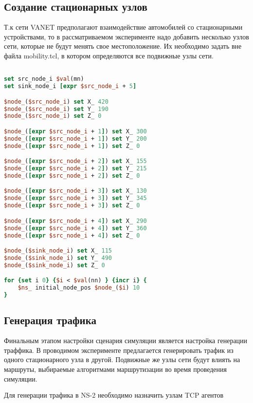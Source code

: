 \subsection*{Создание стационарных узлов}

Т.к сети VANET предполагают взаимодействие автомобилей со стационарными устройствами, то в рассматриваемом эксперименте надо добавить несколько узлов сети, которые не будут менять свое местоположение. Их необходимо задать вне файла mobility.tcl, в котором определяются все подвижные узлы сети.

\begin{lstlisting}[language=tcl, style=mystyle, caption=Настройка узлов сети]

set src_node_i $val(mn)
set sink_node_i [expr $src_node_i + 5]

$node_($src_node_i) set X_ 420
$node_($src_node_i) set Y_ 190
$node_($src_node_i) set Z_ 0

$node_([expr $src_node_i + 1]) set X_ 300
$node_([expr $src_node_i + 1]) set Y_ 200
$node_([expr $src_node_i + 1]) set Z_ 0

$node_([expr $src_node_i + 2]) set X_ 155
$node_([expr $src_node_i + 2]) set Y_ 215
$node_([expr $src_node_i + 2]) set Z_ 0

$node_([expr $src_node_i + 3]) set X_ 130
$node_([expr $src_node_i + 3]) set Y_ 345
$node_([expr $src_node_i + 3]) set Z_ 0

$node_([expr $src_node_i + 4]) set X_ 290
$node_([expr $src_node_i + 4]) set Y_ 360
$node_([expr $src_node_i + 4]) set Z_ 0

$node_($sink_node_i) set X_ 115
$node_($sink_node_i) set Y_ 490
$node_($sink_node_i) set Z_ 0

for {set i 0} {$i < $val(nn) } {incr i} {
    $ns_ initial_node_pos $node_($i) 10
}
\end{lstlisting}


\subsection*{Генерация трафика}

Финальным этапом настройки сценария симуляции является настройка генерации траффика. В проводимом эксперименте предлагается генерировать трафик из одного стационарного узла в другой. Подвижные же узлы сети будут влиять на маршруты, выбираемые алгоритмами маршрутизации во время проведения симуляции.

Для генерации трафика в NS-2 необходимо назначить узлам TCP агентов

